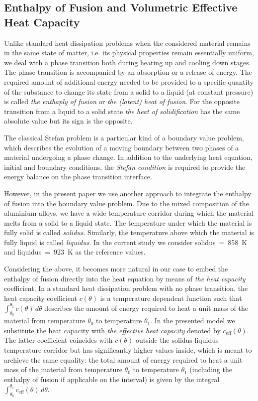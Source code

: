 \subsection{Enthalpy of Fusion and Volumetric Effective Heat Capacity}
\label{subsec:capacity}

Unlike standard heat dissipation problems when the considered material remains in the same state of matter, i.e. its physical properties remain essentially uniform, we deal with a phase transition both during heating up and cooling down stages. The phase transition is accompanied by an absorption or a release of energy. The required amount of additional energy needed to be provided to a specific quantity of the substance to change its state from a solid to a liquid (at constant pressure) is called \emph{the enthaply of fusion} or \emph{the (latent) heat of fusion}. For the opposite transition from a liquid to a solid state \emph{the heat of solidification} has the same absolute value but its sign is the opposite.

The classical Stefan problem  is a particular kind of a boundary value problem, which describes the evolution of a moving boundary between two phases of a material undergoing a phase change. In addition to the underlying heat equation, initial and boundary conditions, the \emph{Stefan condition} is required to provide the energy balance on the phase transition interface.

However, in the present paper we use another approach to integrate the enthalpy of fusion into the boundary value problem. Due to the mixed composition of the aluminium alloys, we have a wide temperature corridor during which the material melts from a solid to a liquid state. The temperature under which the material is fully solid is called \emph{solidus}. Similarly, the temperature above which the material is fully liquid is called \emph{liquidus}. In the current study we consider solidus~=~\SI{858}{\K} and liquidus~=~\SI{923}{K} as the reference values.

Considering the above, it becomes more natural in our case to embed the enthalpy of fusion directly into the heat equation by means of \emph{the heat capacity} coefficient. In a standard heat dissipation problem with no phase transition, the heat capacity coefficient $c(\theta)$ is a temperature dependent function such that $\int_{\theta_0}^{\theta_1} c(\theta)\, d\theta$ describes the amount of energy required to heat a unit mass of the material from temperature $\theta_0$ to temperature $\theta_1$. In the presented model we substitute the heat capacity with \emph{the effective heat capacity} denoted by $c_{\text{eff}}(\theta)$. The latter coefficient coincides with $c(\theta)$ outside the solidus-liquidus temperature corridor but has significantly higher values inside, which is meant to archieve the same equality: the total amount of energy required to heat a unit mass of the material from temperature $\theta_0$ to temperature $\theta_1$ (including the enthalpy of fusion if applicable on the interval) is given by the integral $\int_{\theta_0}^{\theta_1} c_{\text{eff}}(\theta)\, d\theta$.

